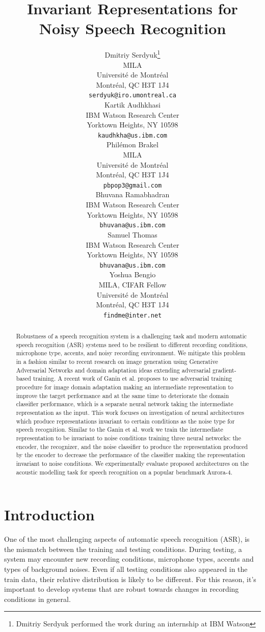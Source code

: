 \documentclass{article}
\title{Invariant Representations for Noisy Speech Recognition}
\author{
  Dmitriy Serdyuk\thanks{Dmitriy Serdyuk performed the work 
    during an internship at IBM Watson} \\
  MILA\\
  Universit\'e de Montr\'eal\\
  Montr\'eal, QC H3T 1J4 \\
  \texttt{serdyuk@iro.umontreal.ca} \\
  \And
  Kartik Audhkhasi \\
  IBM Watson Research Center \\
  Yorktown Heights, NY 10598\\
  \texttt{kaudhkha@us.ibm.com} \\
  \And
  Phil\'emon Brakel \\
  MILA\\
  Universit\'e de Montr\'eal\\
  Montr\'eal, QC H3T 1J4 \\
  \texttt{pbpop3@gmail.com} \\
  \And
  Bhuvana Ramabhadran\\
  IBM  Watson Research Center\\
  Yorktown Heights, NY 10598\\
  \texttt{bhuvana@us.ibm.com} \\
  \And
  Samuel Thomas\\
  IBM  Watson Research Center\\
  Yorktown Heights, NY 10598\\
  \texttt{bhuvana@us.ibm.com} \\
  \And
  Yoshua Bengio\\
  MILA, CIFAR Fellow\\
  Universit\'e de Montr\'eal\\
  Montr\'eal, QC H3T 1J4 \\
  \texttt{findme@inter.net} \\
}
\begin{document}
%
\maketitle
%
\begin{abstract}
    Robustness of a speech recognition system is a challenging task and modern
    automatic speech recognition (ASR) systems need to be resilient to different recording conditions,
    microphone type, accents, and noisy recording environment. We mitigate
    this problem in a fashion similar to recent research on image generation using
    Generative Adversarial Networks and domain adaptation ideas extending
    adversarial gradient-based training. A recent work of Ganin et al. proposes to
    use adversarial training procedure for image domain adaptation making an intermediate
    representation to improve the target performance and at the same time
    to deteriorate the domain classifier performance, which is a separate neural
    network taking the intermediate representation as the input.
    This work focuses on investigation of neural architectures which produce
    representations invariant to certain conditions as the noise type for speech
    recognition. Similar
    to the Ganin et al. work we train the intermediate representation to be invariant
    to noise conditions training three neural networks: the encoder, the recognizer, and the
    noise classifier to produce the representation produced by the encoder to decrease
    the performance of the classifier making the representation invariant to noise conditions. We
    experimentally evaluate proposed architectures on the acoustic modelling task
    for speech recognition on a popular benchmark Aurora-4.
\end{abstract}
%
%
\section{Introduction}
\label{sec:intro}
    One of the most challenging aspects of automatic speech recognition (ASR),
    is the mismatch between the training and testing conditions. During
    testing, a system may encounter new recording conditions, microphone types,
    accents and types of background noises. Even if all testing conditions also appeared
    in the train data, their relative distribution is likely to be
    different. For this reason, it's important to develop systems that are
    robust towards changes in recording conditions in general.
\end{document}
